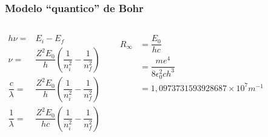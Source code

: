 \documentclass[12pt,brazil]{beamer}
\begin{document}
\begin{frame}
  \frametitle{Modelo ``quantico'' de Bohr}
  \fontsize{9pt}{11pt}\selectfont
        
    \begin{columns}[c]

      \column{6cm}
      \begin{align*}
          h\nu = & E_i - E_f\\
          \nu = & \dfrac{Z^2E_0}{h} \left( \dfrac{1}{n_i^2}-\dfrac{1}{n_f^2}\right)\\
          \dfrac{c}{\lambda} = & \dfrac{Z^2E_0}{h} \left( \dfrac{1}{n_i^2}-\dfrac{1}{n_f^2}\right)\\
          \dfrac{1}{\lambda} = & \dfrac{Z^2E_0}{hc} \left( \dfrac{1}{n_i^2}-\dfrac{1}{n_f^2}\right)
      \end{align*}
      
      \begin{align*}
          R_\infty &= \dfrac{E_0}{hc}\\
          &= \dfrac{me^4}{8 \epsilon_0^2 ch^3}\\
          &= 1,0973731593928687\times 10^{7} m^{-1}
      \end{align*}
      \column{4cm}
          \vspace*{-1cm}
        \begin{figure}
       \hspace*{0.5cm} \includegraphics[width=3.5cm]{figuras/fig03}
        \end{figure}
      
    \end{columns}
\end{frame}
    
\end{document}

